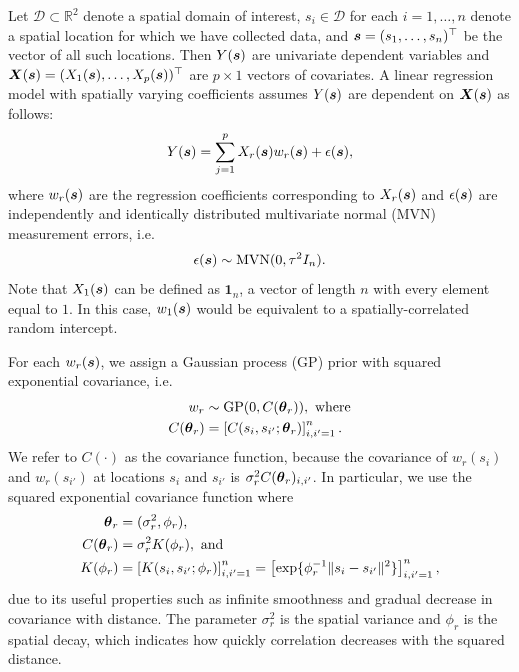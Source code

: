 Let $\mathcal{D} \subset \mathbb{R}^2$ denote a spatial domain of interest, $s_i \in \mathcal{D}$ for each $i = 1, \dots, n$ denote a spatial location for which we have collected data, and $\boldsymbol{s} = (s_1, \dots, s_n)^\top$ be the vector of all such locations. Then $Y(\boldsymbol{s})$ are univariate dependent variables and $\boldsymbol{X}(\boldsymbol{s}) = (X_1(\boldsymbol{s}), \dots, X_p(\boldsymbol{s}))^\top$ are $p \times 1$ vectors of covariates. A linear regression model with spatially varying coefficients assumes $Y(\boldsymbol{s})$ are dependent on $\boldsymbol{X}(\boldsymbol{s})$ as follows:
\begin{align*}
    Y(\boldsymbol{s}) = \sum_{j=1}^p X_r(\boldsymbol{s})w_r(\boldsymbol{s}) + \epsilon(\boldsymbol{s}),
\end{align*}
where $w_r(\boldsymbol{s})$ are the regression coefficients corresponding to $X_r(\boldsymbol{s})$ and $\epsilon(\boldsymbol{s})$ are independently and identically distributed multivariate normal (MVN) measurement errors, i.e.
\begin{align*}
    \epsilon(\boldsymbol{s}) \sim \text{MVN}(0, \tau^2 I_n).
\end{align*}
Note that $X_1(\boldsymbol{s})$ can be defined as $\mathbf{1}_n$, a vector of length $n$ with every element equal to $1$. In this case, $w_1(\boldsymbol{s})$ would be equivalent to a spatially-correlated random intercept.

For each $w_r(\boldsymbol{s})$, we assign a Gaussian process (GP) prior with squared exponential covariance, i.e.
\begin{align*}
    w_r &\sim \text{GP}(0, C(\boldsymbol{\theta}_r)), \text{ where}\\
    C(\boldsymbol{\theta}_r) &= \left[C(s_i, s_{i'}; \boldsymbol{\theta}_r)\right]_{i, i' = 1}^n.
\end{align*}
We refer to $C(\cdot)$ as the covariance function, because the covariance of $w_r(s_i)$ and $w_r(s_{i'})$ at locations $s_i$ and $s_{i'}$ is $\sigma_r^2 C(\boldsymbol{\theta}_r)_{i, i'}$. In particular, we use the squared exponential covariance function where
\begin{align*}
    \boldsymbol{\theta}_r &= (\sigma_r^2, \phi_r),\\
    C(\boldsymbol{\theta}_r) &= \sigma_r^2 K(\phi_r), \text{ and}\\
    K(\phi_r) &= \left[ K(s_i, s_{i'}; \phi_r) \right]_{i, i' = 1}^n = \left[\exp\{\phi_r^{-1}\|s_i-s_{i'}\|^2\}\right]_{i, i' = 1}^n,
\end{align*}
due to its useful properties such as infinite smoothness and gradual decrease in covariance with distance. The parameter $\sigma_r^2$ is the spatial variance and $\phi_r$ is the spatial decay, which indicates how quickly correlation decreases with the squared distance.

